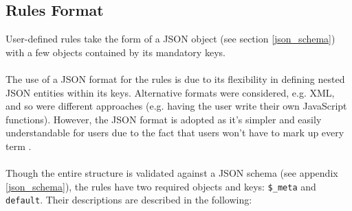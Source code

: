 \subsection{Rules Format} \label{rules_format}
User-defined rules take the form of a JSON object (see section \ref{json_schema}) with a few objects contained by its mandatory keys. 
\\ \\
The use of a JSON format for the rules is due to its flexibility in defining nested JSON entities within its keys. Alternative formats were considered, e.g. XML, and so were different approaches (e.g. having the user write their own JavaScript functions). However, the JSON format is adopted as it's simpler and easily understandable for users due to the fact that users won't have to mark up every term \cite{haq2013comprehensive}.
\\ \\
Though the entire structure is validated against a JSON schema (see appendix \ref{json_schema}), the rules have two required objects and keys: \texttt{\$\_meta} and \texttt{default}. 
Their descriptions are described in the following:
